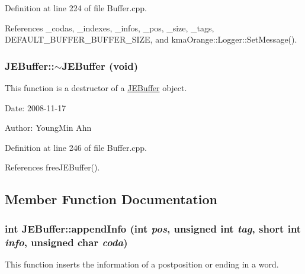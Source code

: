 Definition at line 224 of file Buffer.cpp.

References \_\-codas, \_\-indexes, \_\-infos, \_\-pos, \_\-size, \_\-tags, DEFAULT\_\-BUFFER\_\-BUFFER\_\-SIZE, and kmaOrange::Logger::SetMessage().\hypertarget{classkmaOrange_1_1JEBuffer_ff64ccdec4b316f7d2dd23bd66693f82}{
\subsubsection[{$\sim$JEBuffer}]{\setlength{\rightskip}{0pt plus 5cm}JEBuffer::$\sim$JEBuffer (void)}}
\label{classkmaOrange_1_1JEBuffer_ff64ccdec4b316f7d2dd23bd66693f82}


This function is a destructor of a \hyperlink{classkmaOrange_1_1JEBuffer}{JEBuffer} object. 

\begin{Desc}
\item[Date:]2008-11-17 \end{Desc}
\begin{Desc}
\item[Author:]YoungMin Ahn \end{Desc}


Definition at line 246 of file Buffer.cpp.

References freeJEBuffer().

\subsection{Member Function Documentation}
\hypertarget{classkmaOrange_1_1JEBuffer_aaaffab5a6c0ecad023a286ab81124c1}{
\subsubsection[{appendInfo}]{\setlength{\rightskip}{0pt plus 5cm}int JEBuffer::appendInfo (int {\em pos}, \/  unsigned int {\em tag}, \/  short int {\em info}, \/  unsigned char {\em coda})}}
\label{classkmaOrange_1_1JEBuffer_aaaffab5a6c0ecad023a286ab81124c1}


This function inserts the information of a postposition or ending in a word. 

